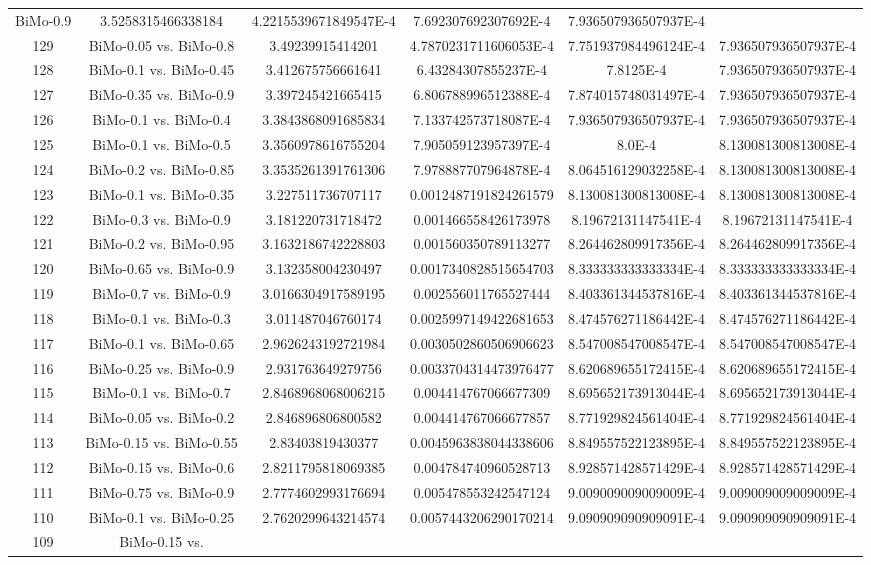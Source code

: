 \documentclass[a4paper,10pt]{article}
\begin{document}
\begin{landscape}
\begin{table}[!htp]
\begin{tabular}{cccccc}
BiMo-0.9&3.5258315466338184&4.2215539671849547E-4&7.692307692307692E-4&7.936507936507937E-4\\129&BiMo-0.05 vs. BiMo-0.8&3.49239915414201&4.7870231711606053E-4&7.751937984496124E-4&7.936507936507937E-4\\128&BiMo-0.1 vs. BiMo-0.45&3.412675756661641&6.43284307855237E-4&7.8125E-4&7.936507936507937E-4\\127&BiMo-0.35 vs. BiMo-0.9&3.397245421665415&6.806788996512388E-4&7.874015748031497E-4&7.936507936507937E-4\\126&BiMo-0.1 vs. BiMo-0.4&3.3843868091685834&7.133742573718087E-4&7.936507936507937E-4&7.936507936507937E-4\\125&BiMo-0.1 vs. BiMo-0.5&3.3560978616755204&7.905059123957397E-4&8.0E-4&8.130081300813008E-4\\124&BiMo-0.2 vs. BiMo-0.85&3.3535261391761306&7.978887707964878E-4&8.064516129032258E-4&8.130081300813008E-4\\123&BiMo-0.1 vs. BiMo-0.35&3.227511736707117&0.0012487191824261579&8.130081300813008E-4&8.130081300813008E-4\\122&BiMo-0.3 vs. BiMo-0.9&3.181220731718472&0.001466558426173978&8.19672131147541E-4&8.19672131147541E-4\\121&BiMo-0.2 vs. BiMo-0.95&3.1632186742228803&0.001560350789113277&8.264462809917356E-4&8.264462809917356E-4\\120&BiMo-0.65 vs. BiMo-0.9&3.132358004230497&0.0017340828515654703&8.333333333333334E-4&8.333333333333334E-4\\119&BiMo-0.7 vs. BiMo-0.9&3.0166304917589195&0.002556011765527444&8.403361344537816E-4&8.403361344537816E-4\\118&BiMo-0.1 vs. BiMo-0.3&3.011487046760174&0.0025997149422681653&8.474576271186442E-4&8.474576271186442E-4\\117&BiMo-0.1 vs. BiMo-0.65&2.9626243192721984&0.0030502860506906623&8.547008547008547E-4&8.547008547008547E-4\\116&BiMo-0.25 vs. BiMo-0.9&2.931763649279756&0.0033704314473976477&8.620689655172415E-4&8.620689655172415E-4\\115&BiMo-0.1 vs. BiMo-0.7&2.8468968068006215&0.004414767066677309&8.695652173913044E-4&8.695652173913044E-4\\114&BiMo-0.05 vs. BiMo-0.2&2.846896806800582&0.004414767066677857&8.771929824561404E-4&8.771929824561404E-4\\113&BiMo-0.15 vs. BiMo-0.55&2.83403819430377&0.0045963838044338606&8.849557522123895E-4&8.849557522123895E-4\\112&BiMo-0.15 vs. BiMo-0.6&2.8211795818069385&0.004784740960528713&8.928571428571429E-4&8.928571428571429E-4\\111&BiMo-0.75 vs. BiMo-0.9&2.7774602993176694&0.005478553242547124&9.009009009009009E-4&9.009009009009009E-4\\110&BiMo-0.1 vs. BiMo-0.25&2.7620299643214574&0.0057443206290170214&9.090909090909091E-4&9.090909090909091E-4\\109&BiMo-0.15 vs. 
\end{tabular}
\end{table}
\end{landscape}
\end{document}
